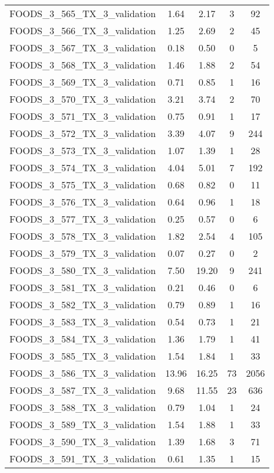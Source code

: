 \begin{table}
\begin{tabular}{|l|c|c|c|c|}
FOODS\_3\_565\_TX\_3\_validation & 1.64 & 2.17 & 3 & 92 \\
FOODS\_3\_566\_TX\_3\_validation & 1.25 & 2.69 & 2 & 45 \\
FOODS\_3\_567\_TX\_3\_validation & 0.18 & 0.50 & 0 & 5 \\
FOODS\_3\_568\_TX\_3\_validation & 1.46 & 1.88 & 2 & 54 \\
FOODS\_3\_569\_TX\_3\_validation & 0.71 & 0.85 & 1 & 16 \\
FOODS\_3\_570\_TX\_3\_validation & 3.21 & 3.74 & 2 & 70 \\
FOODS\_3\_571\_TX\_3\_validation & 0.75 & 0.91 & 1 & 17 \\
FOODS\_3\_572\_TX\_3\_validation & 3.39 & 4.07 & 9 & 244 \\
FOODS\_3\_573\_TX\_3\_validation & 1.07 & 1.39 & 1 & 28 \\
FOODS\_3\_574\_TX\_3\_validation & 4.04 & 5.01 & 7 & 192 \\
FOODS\_3\_575\_TX\_3\_validation & 0.68 & 0.82 & 0 & 11 \\
FOODS\_3\_576\_TX\_3\_validation & 0.64 & 0.96 & 1 & 18 \\
FOODS\_3\_577\_TX\_3\_validation & 0.25 & 0.57 & 0 & 6 \\
FOODS\_3\_578\_TX\_3\_validation & 1.82 & 2.54 & 4 & 105 \\
FOODS\_3\_579\_TX\_3\_validation & 0.07 & 0.27 & 0 & 2 \\
FOODS\_3\_580\_TX\_3\_validation & 7.50 & 19.20 & 9 & 241 \\
FOODS\_3\_581\_TX\_3\_validation & 0.21 & 0.46 & 0 & 6 \\
FOODS\_3\_582\_TX\_3\_validation & 0.79 & 0.89 & 1 & 16 \\
FOODS\_3\_583\_TX\_3\_validation & 0.54 & 0.73 & 1 & 21 \\
FOODS\_3\_584\_TX\_3\_validation & 1.36 & 1.79 & 1 & 41 \\
FOODS\_3\_585\_TX\_3\_validation & 1.54 & 1.84 & 1 & 33 \\
FOODS\_3\_586\_TX\_3\_validation & 13.96 & 16.25 & 73 & 2056 \\
FOODS\_3\_587\_TX\_3\_validation & 9.68 & 11.55 & 23 & 636 \\
FOODS\_3\_588\_TX\_3\_validation & 0.79 & 1.04 & 1 & 24 \\
FOODS\_3\_589\_TX\_3\_validation & 1.54 & 1.88 & 1 & 33 \\
FOODS\_3\_590\_TX\_3\_validation & 1.39 & 1.68 & 3 & 71 \\
FOODS\_3\_591\_TX\_3\_validation & 0.61 & 1.35 & 1 & 15 \\

\end{tabular}
\end{table}
